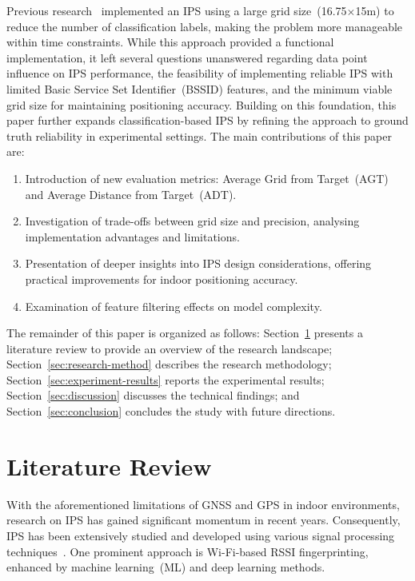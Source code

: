 \documentclass[runningheads]{llncs}
\begin{document}
Previous research~\cite{LRE1} implemented an IPS using a large grid size~(16.75$\times$15m) to reduce the number of classification labels, making the problem more manageable within time constraints. While this approach provided a functional implementation, it left several questions unanswered regarding data point influence on IPS performance, the feasibility of implementing reliable IPS with limited Basic Service Set Identifier~(BSSID) features, and the minimum viable grid size for maintaining positioning accuracy. Building on this foundation, this paper further expands classification-based IPS by refining the approach to ground truth reliability in experimental settings. The main contributions of this paper are:
\begin{enumerate}
	\item Introduction of new evaluation metrics: Average Grid from Target~(AGT) and Average Distance from Target~(ADT).
	\item Investigation of trade-offs between grid size and precision, analysing implementation advantages and limitations.
	\item Presentation of deeper insights into IPS design considerations, offering practical improvements for indoor positioning accuracy.
	\item Examination of feature filtering effects on model complexity.
\end{enumerate}
The remainder of this paper is organized as follows: Section~\ref{sec:literature-review} presents a literature review to provide an overview of the research landscape; Section~\ref{sec:research-method} describes the research methodology; Section~\ref{sec:experiment-results} reports the experimental results; Section~\ref{sec:discussion} discusses the technical findings; and Section~\ref{sec:conclusion} concludes the study with future directions.


\section{Literature Review}\label{sec:literature-review}

With the aforementioned limitations of GNSS and GPS in indoor environments, research on IPS has gained significant momentum in recent years. Consequently, IPS has been extensively studied and developed using various signal processing techniques~\cite{bgp4}. One prominent approach is Wi-Fi-based RSSI fingerprinting, enhanced by machine learning~(ML) and deep learning methods.
\end{document}
